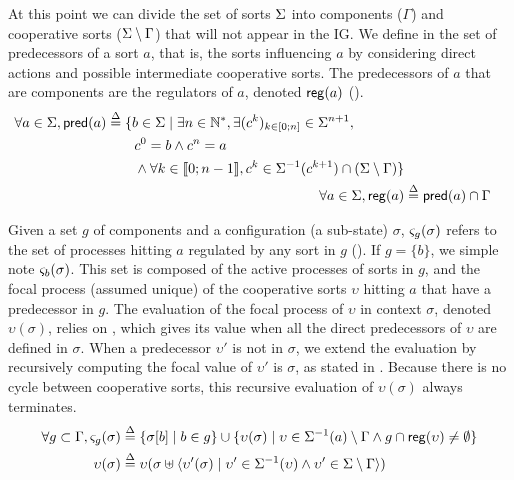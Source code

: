 At this point we can divide the set of sorts $\Sigma$ into components ($\Gamma$) and cooperative sorts
($\Sigma \setminus \Gamma$) that will not appear in the IG. 
We define in  the set of predecessors of a sort $a$, that is, the sorts influencing $a$
by considering direct actions and possible intermediate cooperative sorts.
The predecessors of $a$ that are components are the regulators of $a$, denoted $\mathsf{reg}({a})$
().
\begin{align}
\begin{split}
\forall a \in \Sigma, \mathsf{pred}(a) &\stackrel{\Delta}= \{b \in \Sigma \mid \exists n \in \mathbb{N}^*, \exists
(c^k)_{k \in [0;n]} \in \Sigma^{n+1}, \\
                                   & \quad \quad c^0 = b \wedge c^n = a \\
                                   & \quad \quad \wedge \forall k \in \llbracket 0 ; n-1 \rrbracket,
								   c^k \in \Sigma^{-1}(c^{k+1}) \cap (\Sigma\setminus\Gamma)\}
\end{split}
\label{eq:ph_predec}
\\
\forall a\in \Sigma, \mathsf{reg}({a}) & \stackrel{\Delta}= \mathsf{pred}(a) \cap \Gamma
\label{eq:regulators}
\end{align}

Given a set $g$ of components and a configuration (\ie a sub-state) $\sigma$, $\varsigma_g(\sigma)$
refers to the set of processes hitting $a$ regulated by any sort in $g$ ().
If $g=\{b\}$, we simple note $\varsigma_b(\sigma)$.
This set is composed of the active processes of sorts in $g$, and the focal process (assumed
unique) of the cooperative sorts $\upsilon$ hitting $a$ that have a predecessor in $g$.
The evaluation of the focal process of $\upsilon$ in context $\sigma$, denoted $\upsilon(\sigma)$,
relies on , which gives its value when all the direct predecessors of
$\upsilon$ are defined in $\sigma$.
When a predecessor $\upsilon'$ is not in $\sigma$, we extend the evaluation by recursively computing
the focal value of $\upsilon'$ is $\sigma$, as stated in .
Because there is no cycle between cooperative sorts, this recursive evaluation of $\upsilon(\sigma)$
always terminates.
\begin{align}
\forall g\subset \Gamma,
	\varsigma_g(\sigma) & \stackrel{\Delta}= \{ \sigma[b] \mid b\in g \} \cup \{ \upsilon(\sigma) \mid
\upsilon\in\Sigma^{-1}(a) \setminus \Gamma \wedge g\cap \mathsf{reg}({\upsilon}) \neq \emptyset \}
\label{eq:ctx-sigma}
\\
\upsilon(\sigma) & \stackrel{\Delta}=
\upsilon(\sigma \uplus \langle \upsilon'(\sigma) \mid 
	\upsilon'\in\Sigma^{-1}(\upsilon) \wedge
	\upsilon'\in\Sigma\setminus\Gamma  \rangle)
\label{eq:cooperative-eval}
\end{align}

